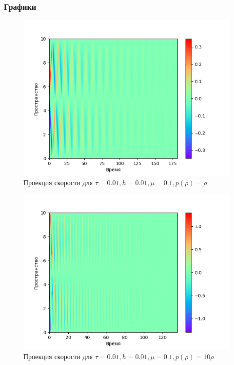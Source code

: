 \documentclass[12pt,a4paper]{article}
\begin{document}
\subsubsection{Графики}
\begin{center}
\begin{figure}[H]
    \centering
    \includegraphics[height=0.4\textheight]{pics/task2/u-2-2-11_1.png}
    \caption{Проекция скорости для $\tau = 0.01, h = 0.01, \mu = 0.1, p(\rho) = \rho$}
\end{figure}

\begin{figure}[H]
    \centering
    \includegraphics[height=0.4\textheight]{pics/task2/u-2-2-12_1.png}
    \caption{Проекция скорости для $\tau = 0.01, h = 0.01, \mu = 0.1, p(\rho) = 10\rho$}
\end{figure}


\end{center}
\end{document}

